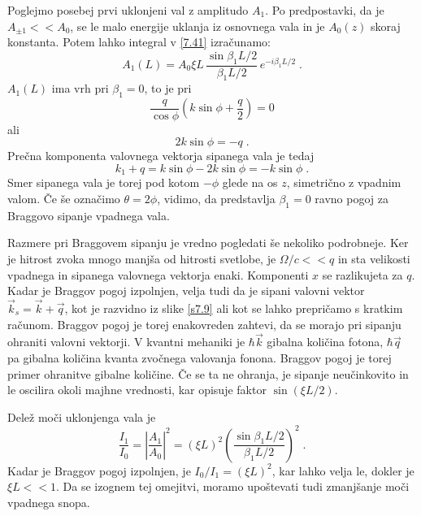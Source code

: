 Poglejmo posebej prvi uklonjeni val z amplitudo $A_{1}$. Po predpostavki,
da je $A_{\pm1}<<A_{0}$, se le malo energije uklanja iz osnovnega
vala in je $A_{0}(z)$ skoraj konstanta. Potem lahko integral v \ref{7.41}
izračunamo: 
\begin{equation}
A_{1}(L)=A_{0}\xi L\,\frac{\sin\beta_{1}L/2}{\beta_{1}L/2}\, e^{-i\beta_{1}L/2}\;.\label{7.41}
\end{equation}
 $A_{1}(L)$ ima vrh pri $\beta_{1}=0$, to je pri 
\begin{equation}
\frac{q}{\cos\phi}(k\sin\phi+\frac{q}{2})=0\label{7.42}
\end{equation}
 ali 
\begin{equation}
2k\sin\phi=-q\;.\label{7.43}
\end{equation}
 Prečna komponenta valovnega vektorja sipanega vala je tedaj 
\begin{equation}
k_{1}+q=k\sin\phi-2k\sin\phi=-k\sin\phi\;.\label{7.44}
\end{equation}
 Smer sipanega vala je torej pod kotom $-\phi$ glede na os $z$,
simetrično z vpadnim valom. Če še označimo $\theta=2\phi$, vidimo,
da predstavlja $\beta_{1}=0$ ravno pogoj za Braggovo sipanje vpadnega
vala.

Razmere pri Braggovem sipanju je vredno pogledati še nekoliko podrobneje.
Ker je hitrost zvoka mnogo manjša od hitrosti svetlobe, je $\Omega/c<<q$
in sta velikosti vpadnega in sipanega valovnega vektorja enaki. Komponenti
$x$ se razlikujeta za $q$. Kadar je Braggov pogoj izpolnjen, velja
tudi da je sipani valovni vektor $\vec{k}_{s}=\vec{k}+\vec{q}$, kot
je razvidno iz slike \ref{s7.9} ali kot se lahko prepričamo s kratkim
računom. Braggov pogoj je torej enakovreden zahtevi, da se morajo
pri sipanju ohraniti valovni vektorji. V kvantni mehaniki je $\hbar\vec{k}$
gibalna količina fotona, $\hbar\vec{q}$ pa gibalna količina kvanta
zvočnega valovanja fonona. Braggov pogoj je torej primer ohranitve
gibalne količine. Če se ta ne ohranja, je sipanje neučinkovito in
le oscilira okoli majhne vrednosti, kar opisuje faktor $\sin(\xi L/2)$.

Delež moči uklonjenga vala je 
\begin{equation}
\frac{I_{1}}{I_{0}}=\left|\frac{A_{1}}{A_{0}}\right|^{2}=(\xi L)^{2}\left(\frac{\sin\beta_{1}L/2}{\beta_{1}L/2}\right)^{2}\;.\label{7.45}
\end{equation}
 Kadar je Braggov pogoj izpolnjen, je $I_{0}/I_{1}=(\xi L)^{2}$,
kar lahko velja le, dokler je $\xi L<<1$. Da se izognem tej omejitvi,
moramo upoštevati tudi zmanjšanje moči vpadnega snopa.

